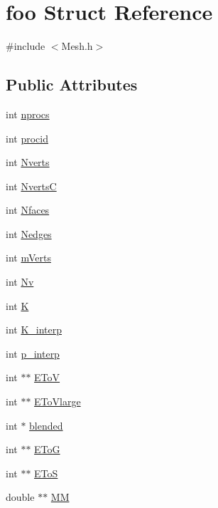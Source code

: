 \hypertarget{a00758}{}\section{foo Struct Reference}
\label{a00758}


{\ttfamily \#include $<$Mesh.\+h$>$}

\subsection*{Public Attributes}
\begin{DoxyCompactItemize}
\item 
int \hyperlink{a00758_a3d147328a5e92ad9a1ce4c8a919300c2}{nprocs}
\item 
int \hyperlink{a00758_a4c4307ab1e67ef6718f253bf30ba1c72}{procid}
\item 
int \hyperlink{a00758_a01736638a000cfa8ea0c65e1eff9fc48}{Nverts}
\item 
int \hyperlink{a00758_a8bbef66d4006f49c1ec3f511e4acca0b}{NvertsC}
\item 
int \hyperlink{a00758_a63eedbb838a3db2003b254052163f82c}{Nfaces}
\item 
int \hyperlink{a00758_a69273169f02e0667c6d527b99ccf587f}{Nedges}
\item 
int \hyperlink{a00758_a48a09bec29d114b30166a1a05be4df1e}{m\+Verts}
\item 
int \hyperlink{a00758_adc314e4fec517ae80875421478f0d167}{Nv}
\item 
int \hyperlink{a00758_a88af07b45ff618ec46138685f5e3d144}{K}
\item 
int \hyperlink{a00758_ab8d64d030cd334ddc0b21444b6adfbba}{K\+\_\+interp}
\item 
int \hyperlink{a00758_a74235beaac11456dcd0a5ecc35bdebbb}{p\+\_\+interp}
\item 
int $\ast$$\ast$ \hyperlink{a00758_a9941817e13f8f73ebac5999b2793839b}{E\+ToV}
\item 
int $\ast$$\ast$ \hyperlink{a00758_ad59288de9be54a0976d1ba249864f295}{E\+To\+Vlarge}
\item 
int $\ast$ \hyperlink{a00758_afffe0eef49bf522cb61782f657e5d543}{blended}
\item 
int $\ast$$\ast$ \hyperlink{a00758_af82659aae195da07fcb4b7daf1b0e940}{E\+ToG}
\item 
int $\ast$$\ast$ \hyperlink{a00758_a55fbc142eb8471d2775d4f0eae7026a2}{E\+ToS}
\item 
double $\ast$$\ast$ \hyperlink{a00758_aa6f8e5d12c1f6f7da75147af74af971c}{MM}
$$
\end{DoxyCompactItemize}

